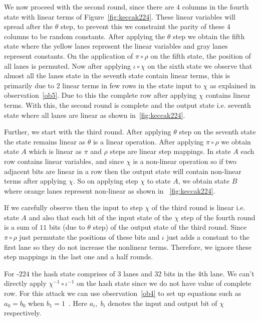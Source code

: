 We now proceed with the second round, since there are $4$ columns in the fourth state with linear terms of Figure~\ref{fig:keccak224}. These linear variables will spread after the $\theta$ step, to prevent this we constraint the parity of these $4$ columns to be random constants. After applying the $\theta$ step we obtain the fifth state where the yellow lanes represent the linear variables and gray lanes represent constants. On the application of $\pi \circ \rho$ on the fifth state, the position of all lanes is permuted. Now after applying $\iota \circ \chi$ on the sixth state we observe that almost all the lanes state in the seventh state contain linear terms, this is primarily due to 2 linear terms in few rows in the state input to $\chi$ as explained in observation~\ref{ob5}. Due to this the complete row after applying $\chi$ contains linear terms. With this, the second round is complete and the output state i.e. seventh state where all lanes are linear as shown in~\ref{fig:keccak224}.

Further, we start with the third round. After applying $\theta$ step on the seventh state the state remains linear as $\theta$ is a linear operation. After applying $\pi \circ \rho$ we obtain state $A$ which is linear as $\pi$ and $\rho$ steps are linear step mappings. In state $A$ each row contains linear variables, and since $\chi$ is a non-linear operation so if two adjacent bits are linear in a row then the output state will contain non-linear terms after applying $\chi$. So on applying step $\chi$ to state $A$, we obtain state $B$ where orange lanes represent non-linear as shown in ~\ref{fig:keccak224}.

If we carefully observe then the input to step $\chi$ of the third round is linear i.e. state $A$ and also that each bit of the input state of the $\chi$ step of the fourth round is a sum of $11$ bits (due to $\theta$ step) of the output state of the third round. Since $\pi \circ \rho$ just permutate the positions of these bits and $\iota$ just adds a constant to the first lane so they do not increase the nonlinear terms. Therefore, we ignore these step mappings in the last one and a half rounds.

For \Keccak{}-$224$ the hash state comprises of 3 lanes and 32 bits in the 4th lane. We can't directly apply $\chi^{-1} \circ \iota^{-1}$ on the hash state since we do not have value of complete row. For this attack we can use observation~\ref{ob4} to set up equations such as $a_0 = b_0$ when $b_1 = 1$~\cite{guo2016linear}. Here $a_i, \; b_i$ denotes the input and output bit of $\chi$ respectively.

